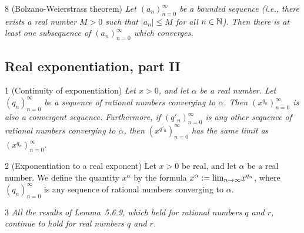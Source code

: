 
\begin{theorem}{8}
    \label{bolzano-weierstrass}
    (Bolzano-Weierstrass theorem) \emph{Let $(a_n)_{n=0}^{\infty}$ be a bounded
    sequence (i.e., there exists a real number $M > 0$ such that $|a_n| \leq M$
    for all $n \in \mathbb{N}$). Then there is at least one subsequence of
    $(a_n)_{n=0}^{\infty}$ which converges.}
\end{theorem}

\subsection{Real exponentiation, part II}
\begin{lemma}{1}
    \label{exponentiation-continuity}
    (Continuity of exponentiation) \emph{Let $x > 0$, and let $\alpha$ be a real
    number. Let $(q_n)_{n=0}^{\infty}$ be a sequence of rational numbers converging
    to $\alpha$. Then $(x^{q_n})_{n=0}^{\infty}$ is also a convergent sequence.
    Furthermore, if $(q'_n)_{n=0}^{\infty}$ is any other sequence of rational numbers
    converging to $\alpha$, then $(x^{q'_n})_{n=0}^{\infty}$ has the same limit
    as $(x^{q_n})_{n=0}^{\infty}$.}
\end{lemma}

\begin{definition}{2}
    \label{real-pow-real}
    (Exponentiation to a real exponent) Let $x > 0$ be real, and let $\alpha$ be
    a real number. We define the quantity $x^\alpha$ by the formula $x^\alpha := \text{lim}_{n \rightarrow \infty}{x^{q_n}}$,
    where $(q_n)_{n=0}^{\infty}$ is any sequence of rational numbers converging to $\alpha$.
\end{definition}

\begin{proposition}{3}
    \label{real-pow-real-laws}
    \emph{All the results of Lemma~5.6.9, which held for rational numbers $q$ and
    $r$, continue to hold for real numbers $q$ and $r$.}
\end{proposition}
